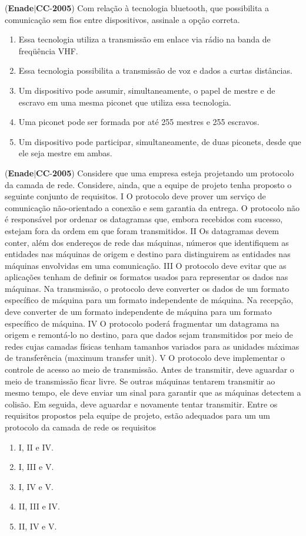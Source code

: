 \documentclass{exam}
\begin{document}
\begin{questions}
\question (\textbf{Enade}$|$\textbf{CC}-\textbf{2005}) Com relação à tecnologia bluetooth, que possibilita a
comunicação sem fios entre dispositivos, assinale a opção
correta.
	\begin{enumerate}[label=\alph*)]
		\item  Essa tecnologia utiliza a transmissão em enlace via rádio na
banda de freqüência VHF.
		\item  Essa tecnologia possibilita a transmissão de voz e dados a
curtas distâncias.
		\item  Um dispositivo pode assumir, simultaneamente, o papel de
mestre e de escravo em uma mesma piconet que utiliza essa
tecnologia.
		\item  Uma piconet pode ser formada por até 255 mestres e
255 escravos.
		\item  Um dispositivo pode participar, simultaneamente, de duas
piconets, desde que ele seja mestre em ambas.

	\end{enumerate}

\question (\textbf{Enade}$|$\textbf{CC}-\textbf{2005}) Considere que uma empresa esteja projetando um protocolo da camada de rede. Considere, ainda, que a equipe de projeto tenha
proposto o seguinte conjunto de requisitos.
I O protocolo deve prover um serviço de comunicação não-orientado a conexão e sem garantia da entrega. O protocolo não é
responsável por ordenar os datagramas que, embora recebidos com sucesso, estejam fora da ordem em que foram transmitidos.
II Os datagramas devem conter, além dos endereços de rede das máquinas, números que identifiquem as entidades nas máquinas de
origem e destino para distinguirem as entidades nas máquinas envolvidas em uma comunicação.
III O protocolo deve evitar que as aplicações tenham de definir os formatos usados para representar os dados nas máquinas. Na
transmissão, o protocolo deve converter os dados de um formato específico de máquina para um formato independente de máquina.
Na recepção, deve converter de um formato independente de máquina para um formato específico de máquina.
IV O protocolo poderá fragmentar um datagrama na origem e remontá-lo no destino, para que dados sejam transmitidos por meio de
redes cujas camadas físicas tenham tamanhos variados para as unidades máximas de transferência (maximum transfer unit).
V O protocolo deve implementar o controle de acesso ao meio de transmissão. Antes de transmitir, deve aguardar o meio de
transmissão ficar livre. Se outras máquinas tentarem transmitir ao mesmo tempo, ele deve enviar um sinal para garantir que as
máquinas detectem a colisão. Em seguida, deve aguardar e novamente tentar transmitir.
Entre os requisitos propostos pela equipe de projeto, estão adequados para um um protocolo da camada de rede os requisitos
	\begin{enumerate}[label=\alph*)]
		\item  I, II e IV. 
		\item  I, III e V. 
		\item  I, IV e V. 
		\item  II, III e IV. 
		\item  II, IV e V.


\end{enumerate}
\end{questions}
\end{document}

